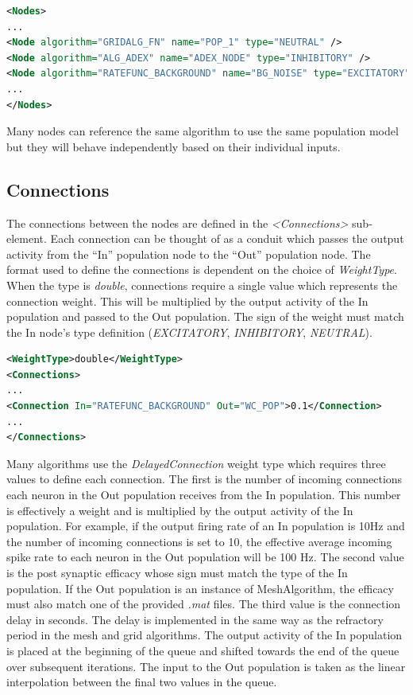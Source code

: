 \documentclass[utf8]{frontiersSCNS} %
\begin{document}
\begin{lstlisting}[language=xml,caption={Three nodes defined in the Nodes section using the types \textit{NEUTRAL}, \textit{INHIBITORY}, and \textit{EXCITATORY} respectively.}]
<Nodes>
...
<Node algorithm="GRIDALG_FN" name="POP_1" type="NEUTRAL" />
<Node algorithm="ALG_ADEX" name="ADEX_NODE" type="INHIBITORY" />
<Node algorithm="RATEFUNC_BACKGROUND" name="BG_NOISE" type="EXCITATORY" />
...
</Nodes>
\end{lstlisting}

Many nodes can reference the same algorithm to use the same population model but they will behave independently based on their individual inputs.\\

\subsection{Connections}

The connections between the nodes are defined in the \textit{\textless Connections\textgreater} sub-element. Each connection can be thought of as a conduit which passes the output activity from the ``In'' population node to the ``Out'' population node. The format used to define the connections is dependent on the choice of \textit{WeightType}. When the type is \textit{double}, connections require a single value which represents the connection weight. This will be multiplied by the output activity of the In population and passed to the Out population. The sign of the weight must match the In node’s type definition (\textit{EXCITATORY}, \textit{INHIBITORY}, \textit{NEUTRAL}).

\begin{lstlisting}[language=xml,caption={A simple double WeightType Connection with a single rate multiplier.}]
<WeightType>double</WeightType>
<Connections>
...
<Connection In="RATEFUNC_BACKGROUND" Out="WC_POP">0.1</Connection>
...
</Connections>
\end{lstlisting}

Many algorithms use the \textit{DelayedConnection} weight type which requires three values to define each connection. The first is the number of incoming connections each neuron in the Out population receives from the In population. This number is effectively a weight and is multiplied by the output activity of the In population. For example, if the output firing rate of an In population is 10Hz and the number of incoming connections is set to 10, the effective average incoming spike rate to each neuron in the Out population will be 100 Hz. The second value is the post synaptic efficacy whose sign must match the type of the In population. If the Out population is an instance of MeshAlgorithm, the efficacy must also match one of the provided \textit{.mat} files. The third value is the connection delay in seconds. The delay is implemented in the same way as the refractory period in the mesh and grid algorithms. The output activity of the In population is placed at the beginning of the queue and shifted towards the end of the queue over subsequent iterations. The input to the Out population is taken as the linear interpolation between the final two values in the queue. 
\end{document}
